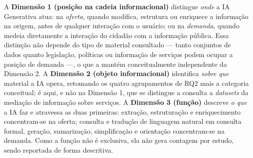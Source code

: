 A \textbf{Dimensão 1 (posição na cadeia informacional)} distingue \emph{onde} a IA Generativa atua: na \emph{oferta}, quando modifica, estrutura ou enriquece a informação na origem, antes de qualquer interação com o usuário; ou na \emph{demanda}, quando medeia diretamente a interação do cidadão com a informação pública. Essa distinção não depende do tipo de material consultado --- tanto conjuntos de dados quanto legislação, políticas ou informação de serviços podem ocupar a posição de demanda ---, o que a mantém conceitualmente independente da Dimensão 2. A \textbf{Dimensão 2 (objeto informacional)} identifica \emph{sobre que} material a IA opera, retomando os quatro agrupamentos de RQ2 mais a categoria conceitual; é aqui, e não na Dimensão 1, que se distingue a consulta a \emph{datasets} da mediação de informação sobre serviços. A \textbf{Dimensão 3 (função)} descreve \emph{o que} a IA faz e atravessa as duas primeiras: extração, estruturação e enriquecimento concentram-se na oferta; consulta e tradução de linguagem natural em consulta formal, geração, sumarização, simplificação e orientação concentram-se na demanda. Como a função não é exclusiva, ela não gera contagem por estudo, sendo reportada de forma descritiva.

